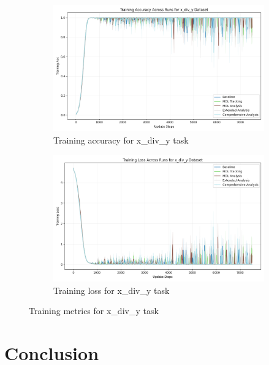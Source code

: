 \documentclass{article} %
\begin{document}
\begin{figure}[h]
    \centering
    \begin{subfigure}{0.49\textwidth}
        \includegraphics[width=\textwidth]{train_acc_x_div_y.png}
        \caption{Training accuracy for x\_div\_y task}
        \label{fig:train_acc_x_div_y}
    \end{subfigure}
    \hfill
    \begin{subfigure}{0.49\textwidth}
        \includegraphics[width=\textwidth]{train_loss_x_div_y.png}
        \caption{Training loss for x\_div\_y task}
        \label{fig:train_loss_x_div_y}
    \end{subfigure}
    \caption{Training metrics for x\_div\_y task}
    \label{fig:training_metrics_x_div_y}
\end{figure}

\section{Conclusion}
\label{sec:conclusion}
\end{document}
